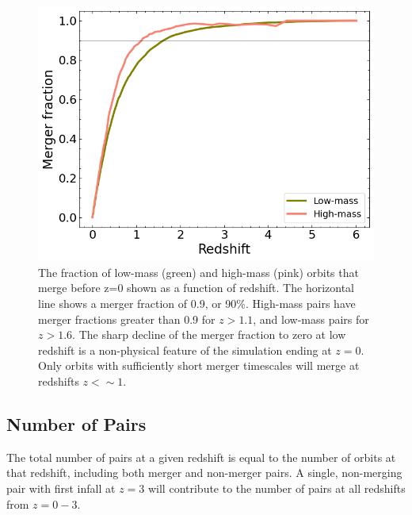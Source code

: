 \documentclass[twocolumn,linenumbers]{aastex631}
\begin{document}
\begin{figure}[htb]
    \begin{center}
    \includegraphics[width=\columnwidth]{plots/bet-on-it/6_mergerfraction.png}
    \caption{The fraction of low-mass (green) and high-mass (pink) orbits that merge before z=0 shown as a function of redshift. 
    The horizontal line shows a merger fraction of 0.9, or 90\%. 
    High-mass pairs have merger fractions greater than 0.9 for $z>1.1$, and low-mass pairs for $z>1.6$.
    The sharp decline of the merger fraction to zero at low redshift is a non-physical feature of the simulation ending at $z=0$.
    Only orbits with sufficiently short merger timescales will merge at redshifts $z<\sim1$.}
    \label{fig:fmerge}
    \end{center}
\end{figure}

\subsection{Number of Pairs}\label{sec:pairprops-num}
The total number of pairs at a given redshift is equal to the number of orbits at that redshift, including both merger and non-merger pairs. 
A single, non-merging pair with first infall at $z=3$ will contribute to the number of pairs at all redshifts from $z=0-3$. 
\end{document}
